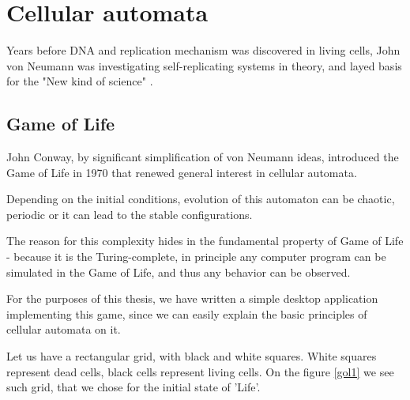 
\chapter{Cellular automata}


Years before DNA and replication mechanism was discovered in living cells,
John von Neumann was investigating self-replicating systems in theory, 
and layed basis for the "New kind of science" \cite{wolfram}. 



\section{Game of Life}

John Conway, by significant simplification of von Neumann ideas, introduced the Game of Life in 1970 that renewed general interest in cellular automata.

Depending on the initial conditions, evolution of this automaton can be chaotic, periodic or it can lead to the stable configurations.

The reason for this complexity hides in the fundamental property of Game of Life - because it is the Turing-complete, in principle any computer program can be simulated in the Game of Life, and thus any behavior can be observed.

For the purposes of this thesis, we have written a simple desktop application implementing this game, since we can easily explain the basic principles of cellular automata on it.

Let us have a rectangular grid, with black and white squares. 
White squares represent dead cells, black cells represent living cells.
On the figure \ref{gol1} we see such grid, that we chose for the initial state of 'Life'.


